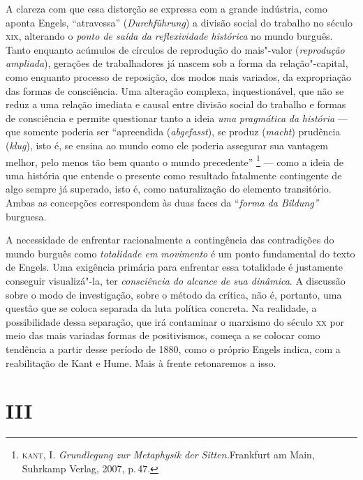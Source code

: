 A clareza com que essa distorção se expressa com a grande indústria,
como aponta Engels, ``atravessa'' (\emph{Durchführung}) a divisão social
do trabalho no século \textsc{xix}, alterando o \emph{ponto de saída da
reflexividade histórica} no mundo burguês. Tanto enquanto acúmulos de
círculos de reprodução do mais"-valor (\emph{reprodução ampliada}),
gerações de trabalhadores já nascem sob a forma da relação"-capital, como
enquanto processo de reposição, dos modos mais variados, da expropriação
das formas de consciência. Uma alteração complexa, inquestionável, que
não se reduz a uma relação imediata e causal entre divisão social do
trabalho e formas de consciência e permite questionar tanto a ideia
\emph{uma} \emph{pragmática} \emph{da} \emph{história} --- que somente
poderia ser ``apreendida (\emph{abgefasst}), se produz (\emph{macht})
prudência (\emph{klug}), isto é, se ensina ao mundo como ele poderia
assegurar sua vantagem melhor, pelo menos tão bem quanto o mundo
precedente'' \footnote{\textsc{kant}, I. \emph{Grundlegung zur Metaphysik der
  Sitten.}Frankfurt am Main, Suhrkamp Verlag, 2007, p.\,47.} --- como a
ideia de uma história que entende o presente como resultado fatalmente
contingente de algo sempre já superado, isto é, como naturalização do
elemento transitório. Ambas as concepções correspondem às duas faces da
``\emph{forma da Bildung''} burguesa.

A necessidade de enfrentar racionalmente a contingência das contradições
do mundo burguês como \emph{totalidade em movimento} é um ponto
fundamental do texto de Engels. Uma exigência primária para enfrentar
essa totalidade é justamente conseguir visualizá"-la, ter
\emph{consciência do alcance de sua dinâmica}. A discussão sobre o modo
de investigação, sobre o método da crítica, não é, portanto, uma questão
que se coloca separada da luta política concreta. Na realidade, a
possibilidade dessa separação, que irá contaminar o marxismo do século
\textsc{xx} por meio das mais variadas formas de positivismos, começa a se
colocar como tendência a partir desse período de 1880, como o próprio
Engels indica, com a reabilitação de Kant e Hume. Mais à frente
retonaremos a isso.

\section*{III}

